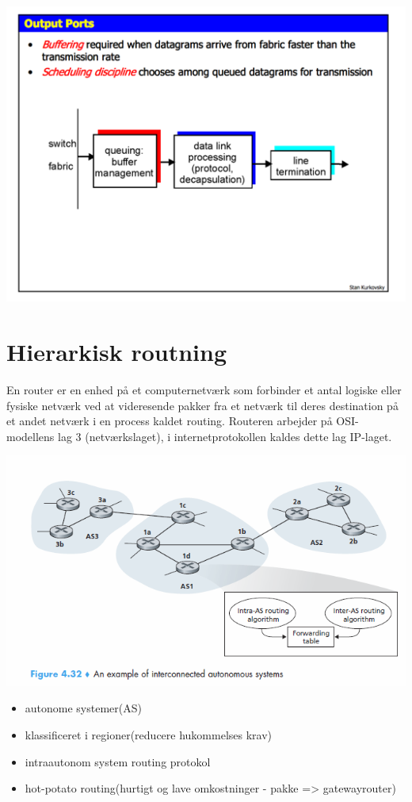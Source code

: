 {{{{{\includegraphics{4-network-layer/router-output-port.png}

\section{Hierarkisk routning}
En router er en enhed på et computernetværk som forbinder et antal logiske eller fysiske netværk ved at videresende pakker fra et netværk til deres destination på et andet netværk i en process kaldet routing. Routeren arbejder på OSI-modellens lag 3 (netværkslaget), i internetprotokollen kaldes dette lag IP-laget.
\begin{center}
  \includegraphics[scale=0.8]{4-network-layer/hierarkisk-routing.png}
\end{center}
\begin{itemize}
	\item autonome systemer(AS)
	\item klassificeret i regioner(reducere hukommelses krav)
	\item intraautonom system routing protokol
	\item hot-potato routing(hurtigt og lave omkostninger - pakke => gatewayrouter)
\end{itemize}

}}}}}
